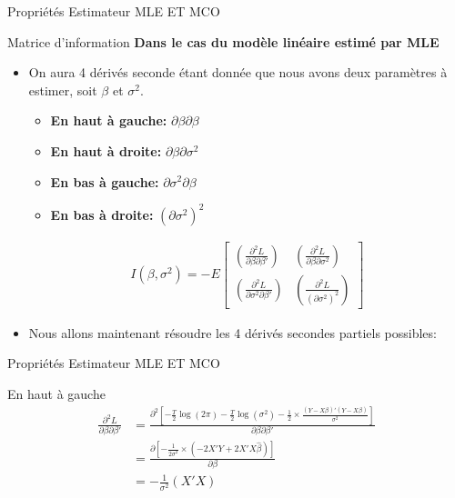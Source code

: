 \documentclass{beamer}
\begin{document}
\begin{frame}{Propriétés Estimateur MLE ET MCO}
\begin{block}{Matrice d'information}
\textbf{Dans le cas du modèle linéaire estimé par MLE}
\begin{itemize}
\item On aura 4 dérivés seconde étant donnée que nous avons deux paramètres à estimer, soit $\beta$ et $\sigma^2$.
\begin{itemize}
\item \textbf{En haut à gauche:} $\partial \beta \partial \beta$
\item \textbf{En haut à droite:} $\partial \beta \partial \sigma^2$
\item \textbf{En bas à gauche:} $\partial \sigma^2 \partial \beta$
\item \textbf{En bas à droite:} $(\partial \sigma^2)^2$
\end{itemize}

\begin{align*}
I(\beta, \sigma^2) = -E\begin{bmatrix}
\left( \frac{\partial^2 L}{\partial \beta \partial \beta'}\right) & \left( \frac{\partial^2 L}{\partial \beta \partial \sigma^2}\right) \\
\left( \frac{\partial^2 L}{\partial \sigma^2 \partial \beta'}\right) & \left( \frac{\partial^2 L}{(\partial \sigma^2)^2}\right)
\end{bmatrix}
\end{align*}
\item Nous allons maintenant résoudre les 4 dérivés secondes partiels possibles:
\end{itemize}
\end{block}
\end{frame}

\begin{frame}{Propriétés Estimateur MLE ET MCO}
\begin{block}{En haut à gauche}
\begin{align*}
\frac{\partial^2 L}{\partial \beta \partial \beta'} & =\frac{\partial^2 \left[ -\frac{T}{2} \log (2 \pi) -\frac{T}{2} \log (\sigma^2)-\frac{1}{2} \times \frac{(Y-X \beta)'(Y-X \beta)}{\sigma^2} \right]}{\partial \beta \partial \beta'}  \\ & = \frac{\partial \left[-\frac{1}{2 \sigma^2} \times (-2X'Y+2X'X \hat{\beta}) \right]}{\partial \beta} \\ & = -\frac{1}{\sigma^2}(X'X)
\end{align*}
\end{block}

\end{frame}
\end{document}
